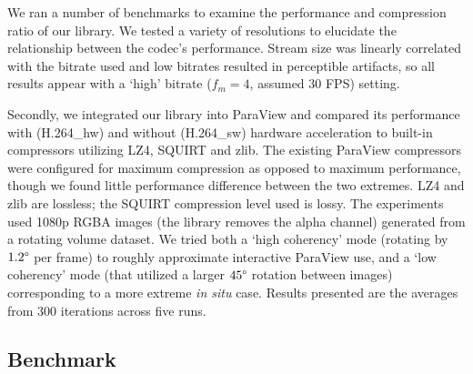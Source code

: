 \documentclass[review]{vgtc}                 %
\begin{document}
We ran a number of benchmarks to examine the performance and
compression ratio of our library. We tested a variety of resolutions to
elucidate the relationship between the codec's performance.  Stream
size was linearly correlated with the bitrate used and
low bitrates resulted in perceptible artifacts, so all results appear
with a `high' bitrate ($f_m=4$, assumed 30 FPS) setting.


Secondly, we integrated our library into ParaView and compared its
performance with (H.264\_hw) and without (H.264\_sw) hardware acceleration to built-in
compressors utilizing LZ4, SQUIRT and zlib.  The existing ParaView
compressors were configured for maximum compression as opposed to
maximum performance, though we found little performance difference
between the two extremes.  LZ4 and zlib are lossless; the SQUIRT
compression level used is lossy.  The experiments used 1080p RGBA
images (the library removes the alpha channel) generated from a
rotating volume dataset.  We tried both a `high coherency' mode
(rotating by
$1.2\degree{}$ per frame) to roughly approximate interactive ParaView
use, and a `low coherency' mode (that utilized a larger $45\degree{}$
rotation between
images) corresponding to a more extreme \textit{in situ} case.  Results
presented are the averages from 300 iterations across five runs.


\subsection{Benchmark}
\end{document}
